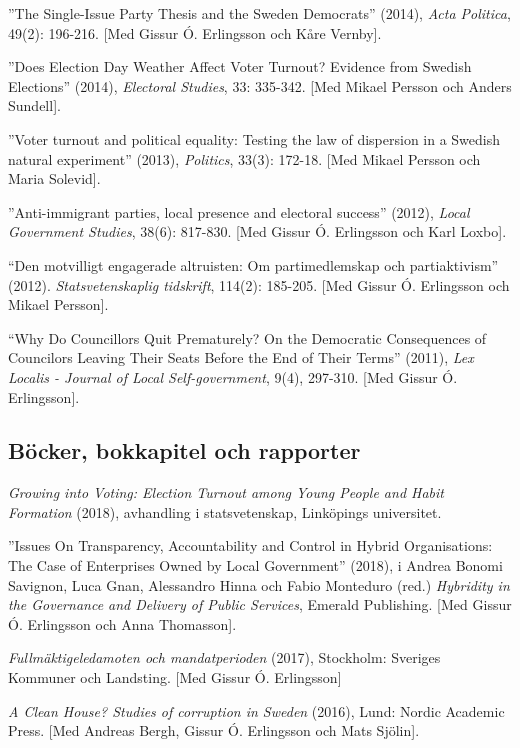\documentclass[11pt,]{article}
\begin{document}
''The Single-Issue Party Thesis and the Sweden Democrats'' (2014),
\emph{Acta Politica}, 49(2): 196-216. {[}Med Gissur Ó. Erlingsson och
Kåre Vernby{]}.

''Does Election Day Weather Affect Voter Turnout? Evidence from Swedish
Elections'' (2014), \emph{Electoral Studies}, 33: 335-342. {[}Med Mikael
Persson och Anders Sundell{]}.

''Voter turnout and political equality: Testing the law of dispersion in
a Swedish natural experiment'' (2013), \emph{Politics}, 33(3): 172-18.
{[}Med Mikael Persson och Maria Solevid{]}.

''Anti-immigrant parties, local presence and electoral success'' (2012),
\emph{Local Government Studies}, 38(6): 817-830. {[}Med Gissur Ó.
Erlingsson och Karl Loxbo{]}.

``Den motvilligt engagerade altruisten: Om partimedlemskap och
partiaktivism'' (2012). \emph{Statsvetenskaplig tidskrift}, 114(2):
185-205. {[}Med Gissur Ó. Erlingsson och Mikael Persson{]}.

``Why Do Councillors Quit Prematurely? On the Democratic Consequences of
Councilors Leaving Their Seats Before the End of Their Terms'' (2011),
\emph{Lex Localis - Journal of Local Self-government}, 9(4), 297-310.
{[}Med Gissur Ó. Erlingsson{]}.

\hypertarget{bocker-bokkapitel-och-rapporter}{%
\subsection{\texorpdfstring{\textbf{Böcker, bokkapitel och
rapporter}}{Böcker, bokkapitel och rapporter}}\label{bocker-bokkapitel-och-rapporter}}

\emph{Growing into Voting: Election Turnout among Young People and Habit
Formation} (2018), avhandling i statsvetenskap, Linköpings universitet.

''Issues On Transparency, Accountability and Control in Hybrid
Organisations: The Case of Enterprises Owned by Local Government''
(2018), i Andrea Bonomi Savignon, Luca Gnan, Alessandro Hinna och Fabio
Monteduro (red.) \emph{Hybridity in the Governance and Delivery of
Public Services}, Emerald Publishing. {[}Med Gissur Ó. Erlingsson och
Anna Thomasson{]}.

\emph{Fullmäktigeledamoten och mandatperioden} (2017), Stockholm:
Sveriges Kommuner och Landsting. {[}Med Gissur Ó. Erlingsson{]}

\emph{A Clean House? Studies of corruption in Sweden} (2016), Lund:
Nordic Academic Press. {[}Med Andreas Bergh, Gissur Ó. Erlingsson och
Mats Sjölin{]}.
\end{document}
